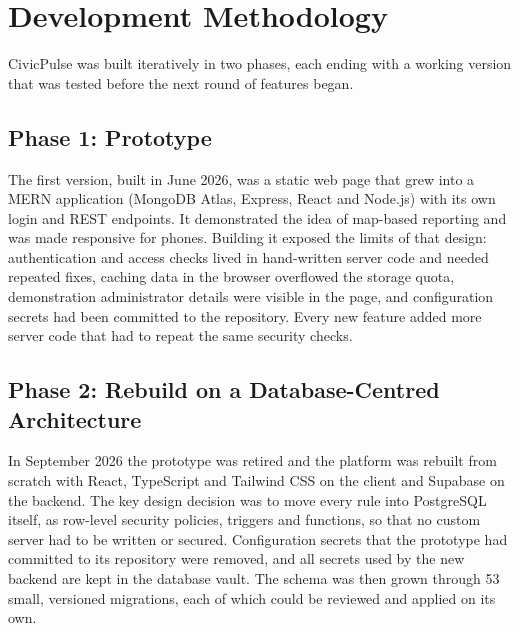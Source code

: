 \documentclass[conference]{IEEEtran}
\begin{document}
\section{Development Methodology}
CivicPulse was built iteratively in two phases, each ending with a working version that was tested before the next round of features began.

\subsection{Phase 1: Prototype}
The first version, built in June 2026, was a static web page that grew into a MERN application (MongoDB Atlas, Express, React and Node.js) with its own login and REST endpoints. It demonstrated the idea of map-based reporting and was made responsive for phones. Building it exposed the limits of that design: authentication and access checks lived in hand-written server code and needed repeated fixes, caching data in the browser overflowed the storage quota, demonstration administrator details were visible in the page, and configuration secrets had been committed to the repository. Every new feature added more server code that had to repeat the same security checks.

\subsection{Phase 2: Rebuild on a Database-Centred Architecture}
In September 2026 the prototype was retired and the platform was rebuilt from scratch with React, TypeScript and Tailwind CSS on the client and Supabase on the backend. The key design decision was to move every rule into PostgreSQL itself, as row-level security policies, triggers and functions, so that no custom server had to be written or secured. Configuration secrets that the prototype had committed to its repository were removed, and all secrets used by the new backend are kept in the database vault. The schema was then grown through 53 small, versioned migrations, each of which could be reviewed and applied on its own.
\end{document}
